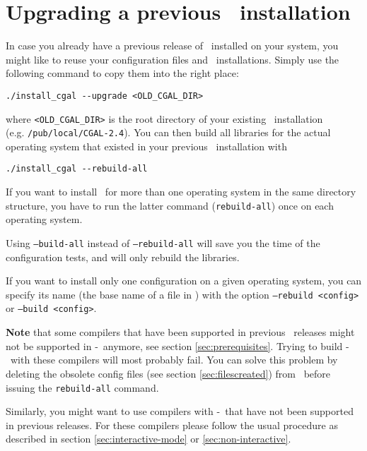 \section{Upgrading a previous \cgal\ installation}
\label{sec:upgrade}

In case you already have a previous release of \cgal\ installed on
your system, you might like to reuse your configuration files and
\gmp\ installations. Simply use the following command to copy them
into the right place:
\begin{verbatim}
./install_cgal --upgrade <OLD_CGAL_DIR>
\end{verbatim}
where \texttt{<OLD\_CGAL\_DIR>} is the root directory of your existing
\cgal\ installation\\ (e.g. \texttt{/pub/local/CGAL-2.4}).  You can
then build all libraries for the actual operating system that existed
in your previous \cgal\ installation with
\begin{verbatim}
./install_cgal --rebuild-all
\end{verbatim}

If you want to install \cgal\ for more than one operating system in
the same directory structure, you have to run the latter command
(\texttt{rebuild-all}) once on each operating system.

Using \texttt{--build-all} instead of \texttt{--rebuild-all} will save
you the time of the configuration tests, and will only rebuild the libraries.

If you want to install only one configuration on a given operating system,
you can specify its name (the base name of a file in \cgalinstconfdir) with
the option \texttt{--rebuild <config>} or \texttt{--build <config>}.

\textbf{Note} that some compilers that have been supported in previous
\cgal\ releases might not be supported in \cgal-\cgalrelease\ anymore,
see section \ref{sec:prerequisites}. Trying to build
\cgal-\cgalrelease\ with these compilers will most probably fail. You
can solve this problem by deleting the obsolete config files (see
section \ref{sec:filescreated}) from \cgalinstconfdir\ before issuing
the \texttt{rebuild-all} command.

Similarly, you might want to use compilers with \cgal-\cgalrelease\ 
that have not been supported in previous releases. For these compilers
please follow the usual procedure as described in section
\ref{sec:interactive-mode} or \ref{sec:non-interactive}.

